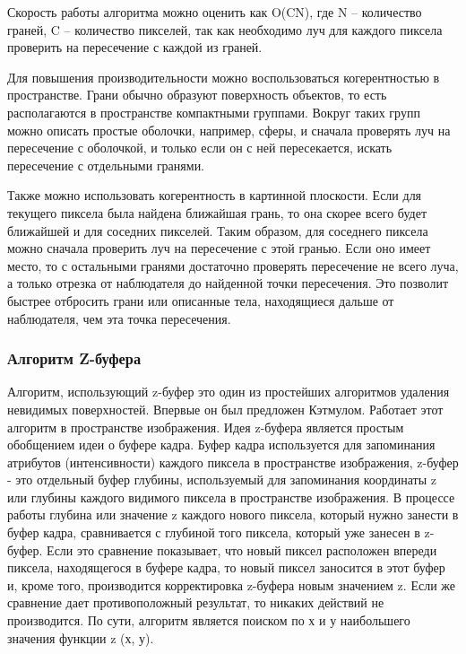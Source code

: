 Скорость работы алгоритма можно оценить как O(CN), где N – количество граней, C – количество пикселей, так как необходимо луч для каждого пиксела проверить на пересечение с каждой из граней.

Для повышения производительности можно воспользоваться когерентностью в пространстве. Грани обычно образуют поверхность объектов, то есть располагаются в пространстве компактными группами. Вокруг таких групп можно описать простые оболочки, например, сферы, и сначала проверять луч на пересечение с оболочкой, и только если он с ней пересекается, искать пересечение с отдельными гранями. 

Также можно использовать когерентность в картинной плоскости. Если для текущего пиксела была найдена ближайшая грань, то она скорее всего будет ближайшей и для соседних пикселей. Таким образом, для соседнего пиксела можно сначала проверить луч на пересечение с этой гранью. Если оно имеет место, то с остальными гранями достаточно проверять пересечение не всего луча, а только отрезка от наблюдателя до найденной точки пересечения. Это позволит быстрее отбросить грани или описанные тела, находящиеся дальше от наблюдателя, чем эта точка пересечения.~\cite{polski}


\subsubsection{Алгоритм Z-буфера}
\label{subsubsection:Zbuff}

\hspace{1.25cm}
Алгоритм, использующий z-буфер это один из простейших алгоритмов удаления невидимых поверхностей. Впервые он был предложен Кэтмулом. Работает этот алгоритм в пространстве изображения. Идея z-буфера является простым обобщением идеи о буфере кадра. Буфер кадра используется для запоминания атрибутов (интенсивности) каждого пиксела в пространстве изображения, z-буфер - это отдельный буфер глубины, используемый для запоминания координаты z или глубины каждого видимого пиксела в пространстве изображения. В процессе работы глубина или значение z каждого нового пиксела, который нужно занести в буфер кадра, сравнивается с глубиной того пиксела, который уже занесен в z-буфер. Если это сравнение показывает, что новый пиксел расположен впереди пиксела, находящегося в буфере кадра, то новый пиксел заносится в этот буфер и, кроме того, производится корректировка z-буфера новым значением z. Если же сравнение дает противоположный результат, то никаких действий не производится. По сути, алгоритм является поиском по х и у наибольшего значения функции z (х, у).

